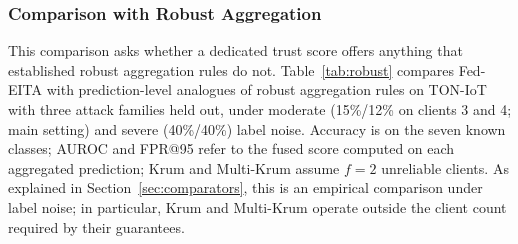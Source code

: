 \documentclass[pdflatex,sn-mathphys-num]{sn-jnl}
\begin{document}
{{{\color{black}
\subsubsection{Comparison with Robust Aggregation}\label{sec:robust}
This comparison asks whether a dedicated trust score offers anything that established robust aggregation rules do not. Table~\ref{tab:robust} compares Fed-EITA with prediction-level analogues of robust aggregation rules on TON-IoT with three attack families held out, under moderate (15\%/12\% on clients 3 and 4; main setting) and severe (40\%/40\%) label noise. Accuracy is on the seven known classes; AUROC and FPR@95 refer to the fused score computed on each aggregated prediction; Krum and Multi-Krum assume $f=2$ unreliable clients. As explained in Section~\ref{sec:comparators}, this is an empirical comparison under label noise; in particular, Krum and Multi-Krum operate outside the client count required by their guarantees.

\begin{table}[!htbp]\centering
\caption{Prediction-level robust aggregation, zero-day setting (three families withheld), moderate and severe noise (mean $\pm$ std, ten seeds).}\label{tab:robust}
\scriptsize
\setlength{\tabcolsep}{4pt}
\end{table}

}}}
\end{document}
